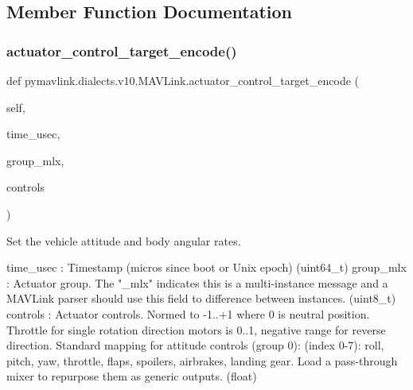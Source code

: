 \subsection{Member Function Documentation}
\mbox{\label{classpymavlink_1_1dialects_1_1v10_1_1MAVLink_a4aa503e7dff90e3be9cd3549aae2b7b5}} 
\subsubsection{\texorpdfstring{actuator\+\_\+control\+\_\+target\+\_\+encode()}{actuator\_control\_target\_encode()}}
{\footnotesize\ttfamily def pymavlink.\+dialects.\+v10.\+M\+A\+V\+Link.\+actuator\+\_\+control\+\_\+target\+\_\+encode (\begin{DoxyParamCaption}\item[{}]{self,  }\item[{}]{time\+\_\+usec,  }\item[{}]{group\+\_\+mlx,  }\item[{}]{controls }\end{DoxyParamCaption})}

\begin{DoxyVerb}Set the vehicle attitude and body angular rates.

time_usec                 : Timestamp (micros since boot or Unix epoch) (uint64_t)
group_mlx                 : Actuator group. The "_mlx" indicates this is a multi-instance message and a MAVLink parser should use this field to difference between instances. (uint8_t)
controls                  : Actuator controls. Normed to -1..+1 where 0 is neutral position. Throttle for single rotation direction motors is 0..1, negative range for reverse direction. Standard mapping for attitude controls (group 0): (index 0-7): roll, pitch, yaw, throttle, flaps, spoilers, airbrakes, landing gear. Load a pass-through mixer to repurpose them as generic outputs. (float)\end{DoxyVerb}
 \mbox{\label{classpymavlink_1_1dialects_1_1v10_1_1MAVLink_a61e70d37e42f04e5e5528fdf328cb6b1}} 
